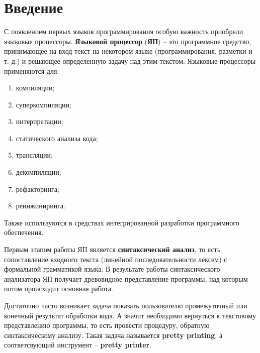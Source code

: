 \section{Введение}


С появлением первых языков программирования особую важность приобрели языковые процессоры. \textbf{Языковой процессор} (\textbf{ЯП}) -- это программное средство, принимающее на вход текст на некотором языке (программирования, разметки и т. д.) и решающее определенную задачу над этим текстом. Языковые процессоры применяются для:
\begin{enumerate}
\item компиляции;
\item суперкомпиляции;
\item интерпретации;
\item статического анализа кода;
\item трансляции;
\item декомпиляции;
\item рефакторинга;
\item реинжиниринга.
\end{enumerate}
Также используются в средствах интегрированной разработки программного обеспечения. 

Первым этапом работы ЯП является \textbf{синтаксический анализ}, то есть сопоставление входного текста (линейной последовательности лексем) с формальной грамматикой языка. В результате работы синтаксического анализатора ЯП получает древовидное представление программы, над которым потом происходит основная работа.

Достаточно часто возникает задача показать пользователю промежуточный или конечный результат обработки кода.
А значит необходимо вернуться к текстовому представлению программы, то есть провести процедуру, обратную синтаксическому анализу. Такая задача называется \textbf{pretty printing}, а соответсвующий инструмент -- \textbf{pretty printer}.

